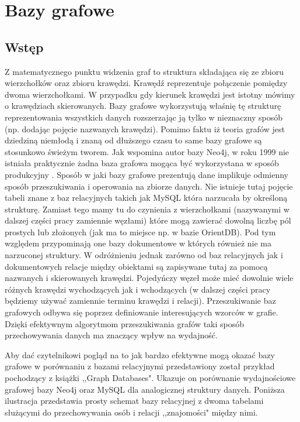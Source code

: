 \documentclass[brudnopis]{xmgr}
\begin{document}
\chapter{Bazy grafowe}

\section{Wstęp}

Z matematycznego punktu widzenia \cite{Szepietowski:2010:MD} graf to struktura składająca się ze zbioru wierzchołków oraz zbioru krawędzi. Krawędź reprezentuje połączenie pomiędzy dwoma wierzchołkami. W przypadku gdy kierunek krawędzi jest istotny mówimy o krawędziach skierowanych. Bazy grafowe wykorzystują właśnię tę strukturę reprezentowania wszystkich danych rozszerzając ją tylko w nieznaczny sposób (np. dodając pojęcie nazwanych krawędzi). Pomimo faktu iż teoria grafów jest dziedziną niemłodą i znaną od dłuższego czasu to same bazy grafowe są stosunkowo świeżym tworem. Jak wspomina autor bazy Neo4j, w roku 1999 nie istniała praktycznie żadna baza grafowa mogąca być wykorzystana w sposób produkcyjny \cite{Robinson:2013:GD}. Sposób w jaki bazy grafowe prezentują dane implikuje odmienny sposób przeszukiwania i operowania na zbiorze danych. Nie istnieje tutaj pojęcie tabeli znane z baz relacyjnych takich jak MySQL która narzucała by określoną strukturę. Zamiast tego mamy tu do czynienia z wierzchołkami (nazywanymi w dalszej części pracy zamiennie węzłami) które mogą zawierać dowolną liczbę pól prostych lub złożonych (jak ma to miejsce np. w bazie OrientDB). Pod tym względem przypominają one bazy dokumentowe w których również nie ma narzuconej struktury. W odróżnieniu jednak zarówno od baz relacyjnych jak i dokumentowych relacje między obiektami są zapisywane tutaj za pomocą nazwanych i skierowanych krawędzi. Pojedyńczy węzeł może mieć dowolnie wiele różnych krawędzi wychodzących jak i wchodzących (w dalszej części pracy będziemy używać zamiennie terminu krawędzi i relacji). Przeszukiwanie baz grafowych odbywa się poprzez definiowanie interesujących wzorców w grafie. Dzięki efektywnym algorytmom przeszukiwania grafów taki sposób przechowywania danych ma znaczący wpływ na wydajność.

Aby dać czytelnikowi pogląd na to jak bardzo efektywne mogą okazać bazy grafowe w porównaniu z bazami relacyjnymi przedstawiony został przykład pochodzący z książki ,,Graph Databases". Ukazuje on porównanie wydajnościowe grafowej bazy Neo4j oraz MySQL dla analogicznej struktury danych. Poniższa ilustracja przedstawia prosty schemat bazy relacyjnej z dwoma tabelami służącymi do przechowywania osób i relacji ,,znajomości" między nimi.
\end{document}

